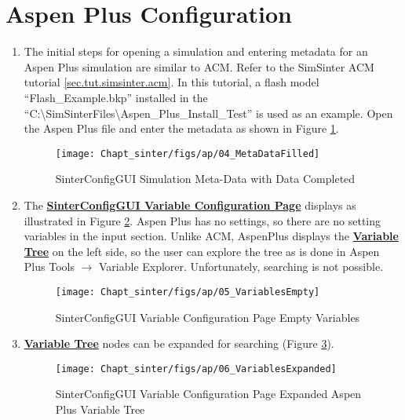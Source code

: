 \section{Aspen Plus Configuration}

\begin{enumerate}
	\item The initial steps for opening a simulation and entering metadata for an Aspen Plus simulation are similar to ACM. Refer to the SimSinter ACM tutorial \ref{sec.tut.simsinter.acm}. In this tutorial, a flash model ``Flash\_Example.bkp'' installed in the ``C:\textbackslash SimSinterFiles\textbackslash Aspen\_Plus\_Install\_Test'' is used as an example. Open the Aspen Plus file and enter the metadata as shown in Figure \ref{fig.sinter.ap.metadata}.
  \begin{figure}[H]
	\begin{center}
		\texttt{[image: Chapt\_sinter/figs/ap/04\_MetaDataFilled]}
		\caption{SinterConfigGUI Simulation Meta-Data with Data Completed}
		\label{fig.sinter.ap.metadata}
	\end{center}
  \end{figure}
  
\item The \textbf{\underline{SinterConfigGUI Variable Configuration Page}} displays as illustrated in Figure \ref{fig.sinter.ap.variableempty}. Aspen Plus has no settings, so there are no setting variables in the input
  section. Unlike ACM, AspenPlus displays the \textbf{\underline{Variable Tree}} on the
  left side, so the user can explore the tree as is done in Aspen Plus
  Tools $\rightarrow$ Variable Explorer.  Unfortunately, searching is not possible.
  \begin{figure}[H]
	\begin{center}
		\texttt{[image: Chapt\_sinter/figs/ap/05\_VariablesEmpty]}
		\caption{SinterConfigGUI Variable Configuration Page Empty Variables}
		\label{fig.sinter.ap.variableempty}
	\end{center}
  \end{figure}

\item \textbf{\underline{Variable Tree}} nodes can be expanded for searching (Figure \ref{fig.sinter.ap.expandtree}).
  \begin{figure}[H]
	\begin{center}
		\texttt{[image: Chapt\_sinter/figs/ap/06\_VariablesExpanded]}
		\caption{SinterConfigGUI Variable Configuration Page Expanded Aspen Plus Variable Tree}
		\label{fig.sinter.ap.expandtree}
	\end{center}
  \end{figure}
  

\end{enumerate}
